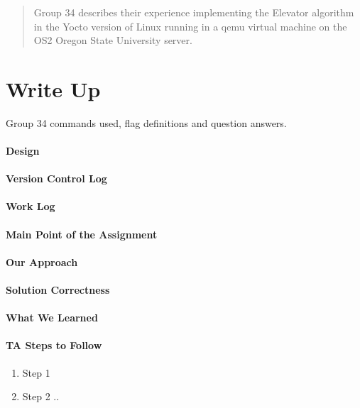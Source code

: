\documentclass[titlepage,draftclsnofoot,onecolumn]{article}
\begin{document}
\maketitle

\begin{abstract}
  Group 34 describes their experience implementing the Elevator algorithm in the Yocto version of Linux running in a qemu virtual machine on the OS2 Oregon State University server.
\end{abstract}

\section*{Write Up}
Group 34 commands used, flag definitions and question answers.

\paragraph{Design}

\paragraph{Version Control Log}

\paragraph{Work Log}

\paragraph{Main Point of the Assignment}

\paragraph{Our Approach}

\paragraph{Solution Correctness}

\paragraph{What We Learned}

\paragraph{TA Steps to Follow}

\begin{enumerate}
  \item Step 1
  \item Step 2 ..
\end{enumerate}
\end{document}
